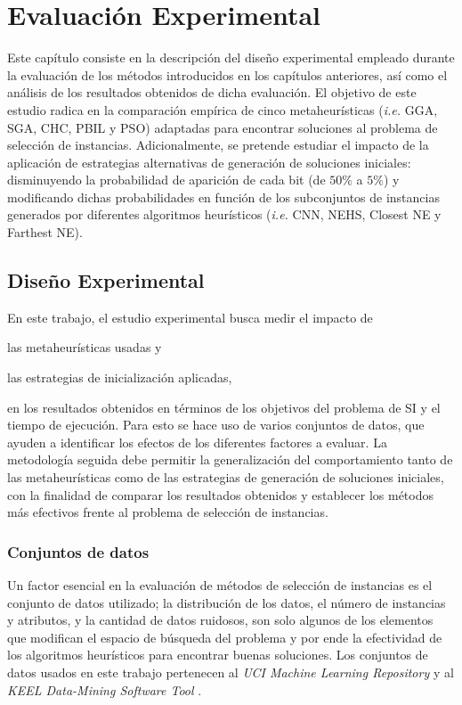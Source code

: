 \chapter{Evaluación Experimental}
\label{capitulo4}

Este capítulo consiste en la descripción del diseño experimental empleado durante la evaluación de los métodos introducidos en los capítulos anteriores, así como el análisis de los resultados obtenidos de dicha evaluación. El objetivo de este estudio radica en la comparación empírica de cinco metaheurísticas (\emph{i.e.} GGA, SGA, CHC, PBIL y PSO) adaptadas para encontrar soluciones al problema de selección de instancias. Adicionalmente, se pretende estudiar el impacto de la aplicación de estrategias alternativas de generación de soluciones iniciales: disminuyendo la probabilidad de aparición de cada bit (de $50\%$ a $5\%$) y modificando dichas probabilidades en función de los subconjuntos de instancias generados por diferentes algoritmos heurísticos (\emph{i.e.} CNN, NEHS, Closest NE y Farthest NE).

\section{Diseño Experimental}

En este trabajo, el estudio experimental busca medir el impacto de 
\begin{inparaenum}
\item las metaheurísticas usadas y
\item las estrategias de inicialización aplicadas,
\end{inparaenum}
en los resultados obtenidos en términos de los objetivos del problema de SI y el tiempo de ejecución. Para esto se hace uso de varios conjuntos de datos, que ayuden a identificar los efectos de los diferentes factores a evaluar.
La metodología seguida debe permitir la generalización del comportamiento tanto de las metaheurísticas como de las estrategias de generación de soluciones iniciales, con la finalidad de comparar los resultados obtenidos y establecer los métodos más efectivos frente al problema de selección de instancias.

\subsection{Conjuntos de datos}
\label{data-section}

Un factor esencial en la evaluación de métodos de selección de instancias es el conjunto de datos utilizado; la distribución de los datos, el número de instancias y atributos, y la cantidad de datos ruidosos, son solo algunos de los elementos que modifican el espacio de búsqueda del problema y por ende la efectividad de los algoritmos heurísticos para encontrar buenas soluciones. Los conjuntos de datos usados en este trabajo pertenecen al \emph{UCI Machine Learning Repository} \cite{BacheLichman:2013} y al \emph{KEEL Data-Mining Software Tool} \cite{alcala2010keel}.

